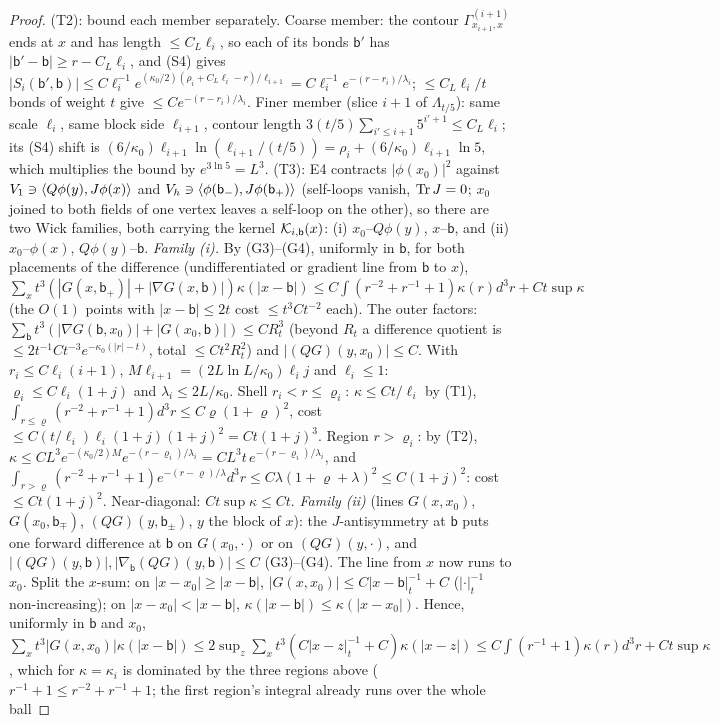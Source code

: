 \begin{proof}
(T2): bound each member separately. Coarse member: the contour $\Gamma^{(i+1)}_{x_{i+1},x}$ ends at $x$ and has length $\le C_L\ell_i$, so each of its bonds $\mathsf b'$ has $|\mathsf b'-\mathsf b|\ge r-C_L\ell_i$, and (S4) gives $|S_i(\mathsf b',\mathsf b)|\le C\ell_i^{-1}e^{(\kappa_0/2)(\rho_i+C_L\ell_i-r)/\ell_{i+1}}=C\ell_i^{-1}e^{-(r-r_i)/\lambda_i}$; $\le C_L\ell_i/t$ bonds of weight $t$ give $\le Ce^{-(r-r_i)/\lambda_i}$. Finer member (slice $i+1$ of $\Lambda_{t/5}$): same scale $\ell_i$, same block side $\ell_{i+1}$, contour length $3(t/5)\sum_{i'\le i+1}5^{i'+1}\le C_L\ell_i$; its (S4) shift is $(6/\kappa_0)\ell_{i+1}\ln(\ell_{i+1}/(t/5))=\rho_i+(6/\kappa_0)\ell_{i+1}\ln5$, which multiplies the bound by $e^{3\ln5}=L^3$.
(T3): E4 contracts $|\phi(x_0)|^2$ against $V_1\ni\langle Q\phi(y),J\phi(x)\rangle$ and $V_h\ni\langle \phi(\mathsf b_-),J\phi(\mathsf b_+)\rangle$ (self-loops vanish, $\operatorname{Tr} J=0$; $x_0$ joined to both fields of one vertex leaves a self-loop on the other), so there are two Wick families, both carrying the kernel $\mathcal K_{i,\mathsf b}(x)$: (i) $x_0$--$Q\phi(y)$, $x$--$\mathsf b$, and (ii) $x_0$--$\phi(x)$, $Q\phi(y)$--$\mathsf b$. \emph{Family (i).} By (G3)--(G4), uniformly in $\mathsf b$, for both placements of the difference (undifferentiated or gradient line from $\mathsf b$ to $x$), $\sum_xt^3(|G(x,\mathsf b_+)|+|\nabla G(x,\mathsf b)|)\kappa(|x-\mathsf b|)\le C\int(r^{-2}+r^{-1}+1)\kappa(r)d^3r+Ct\sup\kappa$ (the $O(1)$ points with $|x-\mathsf b|\le2t$ cost $\le t^3Ct^{-2}$ each). The outer factors: $\sum_{\mathsf b}t^3(|\nabla G(\mathsf b,x_0)|+|G(x_0,\mathsf b)|)\le CR_t^3$ (beyond $R_t$ a difference quotient is $\le2t^{-1}Ct^{-3}e^{-\kappa_0(|r|-t)}$, total $\le Ct^2R_t^2$) and $|(QG)(y,x_0)|\le C$. With $r_i\le C\ell_i(i+1)$, $M\ell_{i+1}=(2L\ln L/\kappa_0)\ell_ij$ and $\ell_i\le1$: $\varrho_i\le C\ell_i(1+j)$ and $\lambda_i\le2L/\kappa_0$. Shell $r_i<r\le\varrho_i$: $\kappa\le Ct/\ell_i$ by (T1), $\int_{r\le\varrho}(r^{-2}+r^{-1}+1)d^3r\le C\varrho(1+\varrho)^2$, cost $\le C(t/\ell_i)\ell_i(1+j)(1+j)^2=Ct(1+j)^3$. Region $r>\varrho_i$: by (T2), $\kappa\le CL^3e^{-(\kappa_0/2)M}e^{-(r-\varrho_i)/\lambda_i}=CL^3t\,e^{-(r-\varrho_i)/\lambda_i}$, and $\int_{r>\varrho}(r^{-2}+r^{-1}+1)e^{-(r-\varrho)/\lambda}d^3r\le C\lambda(1+\varrho+\lambda)^2\le C(1+j)^2$: cost $\le Ct(1+j)^2$. Near-diagonal: $Ct\sup\kappa\le Ct$. \emph{Family (ii)} (lines $G(x,x_0)$, $G(x_0,\mathsf b_\mp)$, $(QG)(y,\mathsf b_\pm)$, $y$ the block of $x$): the $J$-antisymmetry at $\mathsf b$ puts one forward difference at $\mathsf b$ on $G(x_0,\cdot)$ or on $(QG)(y,\cdot)$, and $|(QG)(y,\mathsf b)|,|\nabla_{\mathsf b}(QG)(y,\mathsf b)|\le C$ (G3)--(G4). The line from $x$ now runs to $x_0$. Split the $x$-sum: on $|x-x_0|\ge|x-\mathsf b|$, $|G(x,x_0)|\le C|x-\mathsf b|_t^{-1}+C$ ($|\cdot|_t^{-1}$ non-increasing); on $|x-x_0|<|x-\mathsf b|$, $\kappa(|x-\mathsf b|)\le\kappa(|x-x_0|)$. Hence, uniformly in $\mathsf b$ and $x_0$, $\sum_xt^3|G(x,x_0)|\kappa(|x-\mathsf b|)\le2\sup_z\sum_xt^3(C|x-z|_t^{-1}+C)\kappa(|x-z|)\le C\int(r^{-1}+1)\kappa(r)d^3r+Ct\sup\kappa$, which for $\kappa=\kappa_i$ is dominated by the three regions above ($r^{-1}+1\le r^{-2}+r^{-1}+1$; the first region's integral already runs over the whole ball 
\end{proof}
